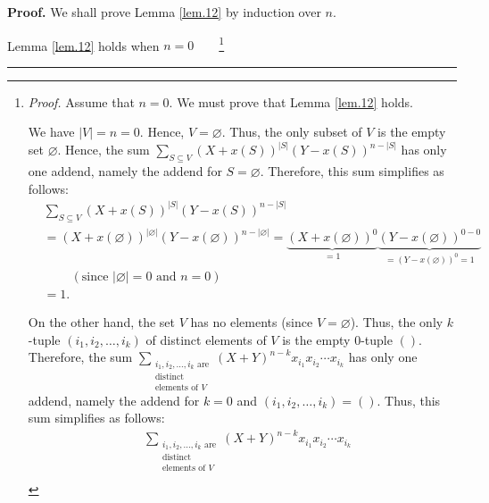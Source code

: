 \documentclass[numbers=enddot,12pt,final,onecolumn,notitlepage]{scrartcl}%
\theoremstyle{definition}
\newenvironment{proof}[1][Proof]{\noindent\textbf{#1.} }{\ \rule{0.5em}{0.5em}}
\let\sumnonlimits\sum
\renewcommand{\sum}{\sumnonlimits\limits}
\newenvironment{verlong}{}{}
\begin{document}
\begin{verlong}
\begin{proof}
We shall prove Lemma \ref{lem.12} by induction over $n$.

Lemma \ref{lem.12} holds when $n=0$\ \ \ \ \footnote{\textit{Proof.} Assume
that $n=0$. We must prove that Lemma \ref{lem.12} holds.
\par
We have $\left\vert V\right\vert =n=0$. Hence, $V=\varnothing$. Thus, the only
subset of $V$ is the empty set $\varnothing$. Hence, the sum $\sum_{S\subseteq
V}\left(  X+x\left(  S\right)  \right)  ^{\left\vert S\right\vert }\left(
Y-x\left(  S\right)  \right)  ^{n-\left\vert S\right\vert }$ has only one
addend, namely the addend for $S=\varnothing$. Therefore, this sum simplifies
as follows:%
\begin{align}
&  \sum_{S\subseteq V}\left(  X+x\left(  S\right)  \right)  ^{\left\vert
S\right\vert }\left(  Y-x\left(  S\right)  \right)  ^{n-\left\vert
S\right\vert }\nonumber\\
&  =\left(  X+x\left(  \varnothing\right)  \right)  ^{\left\vert
\varnothing\right\vert }\left(  Y-x\left(  \varnothing\right)  \right)
^{n-\left\vert \varnothing\right\vert }=\underbrace{\left(  X+x\left(
\varnothing\right)  \right)  ^{0}}_{=1}\underbrace{\left(  Y-x\left(
\varnothing\right)  \right)  ^{0-0}}_{=\left(  Y-x\left(  \varnothing\right)
\right)  ^{0}=1}\nonumber\\
&  \ \ \ \ \ \ \ \ \ \ \left(  \text{since }\left\vert \varnothing\right\vert
=0\text{ and }n=0\right) \nonumber\\
&  =1. \label{pf.lem.12.indbase.fn1.1}%
\end{align}
\par
On the other hand, the set $V$ has no elements (since $V=\varnothing$). Thus,
the only $k$-tuple $\left(  i_{1},i_{2},\ldots,i_{k}\right)  $ of distinct
elements of $V$ is the empty $0$-tuple $\left(  {}\right)  $. Therefore, the
sum $\sum_{\substack{i_{1},i_{2},\ldots,i_{k}\text{ are}\\\text{distinct}%
\\\text{elements of }V}}\left(  X+Y\right)  ^{n-k}x_{i_{1}}x_{i_{2}}\cdots
x_{i_{k}}$ has only one addend, namely the addend for $k=0$ and $\left(
i_{1},i_{2},\ldots,i_{k}\right)  =\left(  {}\right)  $. Thus, this sum
simplifies as follows:%
\begin{align*}
&  \sum_{\substack{i_{1},i_{2},\ldots,i_{k}\text{ are}\\\text{distinct}%
\\\text{elements of }V}}\left(  X+Y\right)  ^{n-k}x_{i_{1}}x_{i_{2}}\cdots
x_{i_{k}}\\

\end{align*}}
\end{proof}
\end{verlong}
\end{document}
